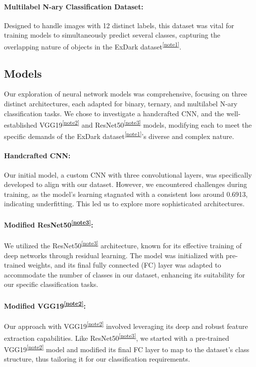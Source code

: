 \documentclass{article} %
\begin{document}
\paragraph{Multilabel N-ary Classification Dataset:} Designed to handle images with 12 distinct labels, this dataset was vital for training models to simultaneously predict several classes, capturing the overlapping nature of objects in the ExDark dataset\textsuperscript{\ref{note1}}.


\subsection{Models}
Our exploration of neural network models was comprehensive, focusing on three distinct architectures, each adapted for binary, ternary, and multilabel N-ary classification tasks. We chose to investigate a handcrafted CNN, and the well-established VGG19\textsuperscript{\ref{note2}} and ResNet50\textsuperscript{\ref{note3}} models, modifying each to meet the specific demands of the ExDark dataset\textsuperscript{\ref{note1}}'s diverse and complex nature.

\paragraph{Handcrafted CNN:} Our initial model, a custom CNN with three convolutional layers, was specifically developed to align with our dataset. However, we encountered challenges during training, as the model's learning stagnated with a consistent loss around 0.6913, indicating underfitting. This led us to explore more sophisticated architectures.

\paragraph{Modified ResNet50\textsuperscript{\ref{note3}}:} We utilized the ResNet50\textsuperscript{\ref{note3}} architecture, known for its effective training of deep networks through residual learning. The model was initialized with pre-trained weights, and its final fully connected (FC) layer was adapted to accommodate the number of classes in our dataset, enhancing its suitability for our specific classification tasks.

\paragraph{Modified VGG19\textsuperscript{\ref{note2}}:} Our approach with VGG19\textsuperscript{\ref{note2}} involved leveraging its deep and robust feature extraction capabilities. Like ResNet50\textsuperscript{\ref{note3}}, we started with a pre-trained VGG19\textsuperscript{\ref{note2}} model and modified its final FC layer to map to the dataset's class structure, thus tailoring it for our classification requirements.
\end{document}
